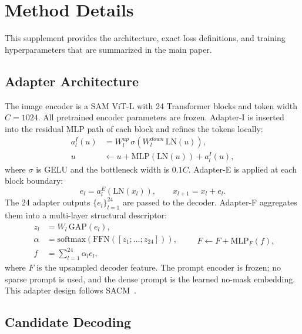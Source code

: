 \section{Method Details}
\label{sec:supp_method}

This supplement provides the architecture, exact loss definitions, and
training hyperparameters that are summarized in the main paper.

\subsection{Adapter Architecture}
\label{sec:supp_adapters}

The image encoder is a SAM ViT-L with 24 Transformer blocks and token width
$C=1024$. All pretrained encoder parameters are frozen. Adapter-I is inserted
into the residual MLP path of each block and refines the tokens locally:
\begin{equation}
\begin{aligned}
a^{I}_l(u)&=W^{up}_l\,\sigma\!\left(W^{down}_l\,\mathrm{LN}(u)\right),\\
u&\leftarrow u+\mathrm{MLP}(\mathrm{LN}(u))+a^{I}_l(u),
\end{aligned}
\end{equation}
where $\sigma$ is GELU and the bottleneck width is $0.1C$. Adapter-E is
applied at each block boundary:
\begin{equation}
e_l=a^{E}_l\!\left(\mathrm{LN}(x_l)\right),
\qquad
x_{l+1}=x_l+e_l .
\end{equation}
The 24 adapter outputs $\{e_l\}_{l=1}^{24}$ are passed to the decoder.
Adapter-F aggregates them into a multi-layer structural descriptor:
\begin{equation}
\begin{aligned}
z_l&=W_l\,\mathrm{GAP}(e_l),\\
\alpha&=\mathrm{softmax}\!\left(\mathrm{FFN}([z_1;\dots;z_{24}])\right),\\
f&=\sum_{l=1}^{24}\alpha_l e_l,
\end{aligned}
\qquad
F\leftarrow F+\mathrm{MLP}_{F}(f),
\end{equation}
where $F$ is the upsampled decoder feature. The prompt encoder is frozen; no
sparse prompt is used, and the dense prompt is the learned no-mask embedding.
This adapter design follows SACM~\cite{zhu2026sacm}.

\subsection{Candidate Decoding}
\label{sec:supp_candidates}

